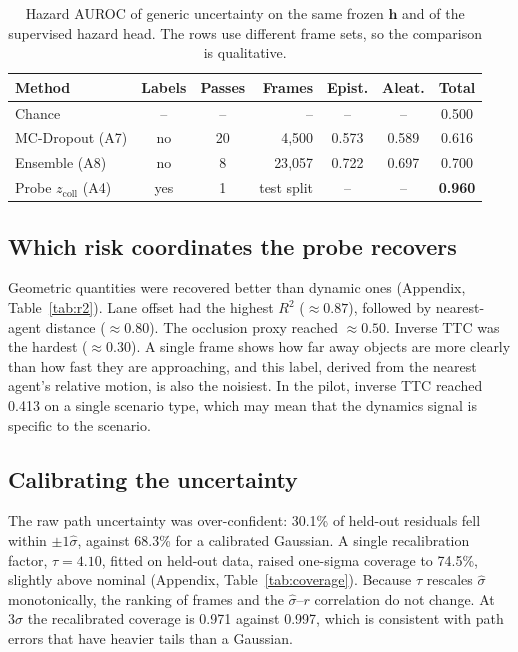 \documentclass[conference]{IEEEtran}
\newcommand{\zcoll}{z_{\mathrm{coll}}}
\newcommand{\sighat}{\hat{\sigma}}
\begin{document}
\begin{table}[t]
\centering
\caption{Hazard AUROC of generic uncertainty on the same frozen $\mathbf{h}$ and of
the supervised hazard head. The rows use different frame sets, so the comparison is
qualitative.}
\label{tab:baselines}
\footnotesize
\setlength{\tabcolsep}{3pt}
\begin{tabular}{@{}l c c r c c c@{}}
\toprule
Method & Labels & Passes & Frames & Epist. & Aleat. & Total \\
\midrule
Chance & -- & -- & -- & -- & -- & 0.500 \\
MC-Dropout (A7) & no & 20 & 4{,}500 & 0.573 & 0.589 & 0.616 \\
Ensemble (A8) & no & 8 & 23{,}057 & 0.722 & 0.697 & 0.700 \\
Probe $\zcoll$ (A4) & yes & 1 & test split & -- & -- & \textbf{0.960} \\
\bottomrule
\end{tabular}
\end{table}

\subsection{Which risk coordinates the probe recovers}

Geometric quantities were recovered better than dynamic ones (Appendix,
Table~\ref{tab:r2}). Lane offset had the highest $R^2$ ($\approx0.87$), followed by
nearest-agent distance ($\approx0.80$). The occlusion proxy reached $\approx0.50$.
Inverse TTC was the hardest ($\approx0.30$). A single frame shows how far away
objects are more clearly than how fast they are approaching, and this label, derived
from the nearest agent's relative motion, is also the noisiest. In the pilot,
inverse TTC reached 0.413 on a single scenario type, which may mean that the dynamics
signal is specific to the scenario.

\subsection{Calibrating the uncertainty}

The raw path uncertainty was over-confident: 30.1\% of held-out residuals fell within
$\pm1\sighat$, against 68.3\% for a calibrated Gaussian. A single recalibration
factor, $\tau=4.10$, fitted on held-out data, raised one-sigma coverage to 74.5\%,
slightly above nominal (Appendix, Table~\ref{tab:coverage}). Because $\tau$
rescales $\sighat$ monotonically, the ranking of frames and the
$\sighat$--$r$ correlation do not change. At $3\sighat$ the recalibrated coverage is
0.971 against 0.997, which is consistent with path errors that have heavier tails
than a Gaussian.
\end{document}
